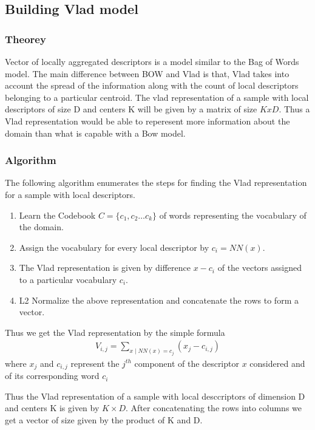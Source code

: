 \documentclass[final,leqno,onefignum,onetabnum]{siamltexmm}
\begin{document}
\subsection{Building Vlad model}

\subsubsection{Theorey}
Vector of locally aggregated descriptors is a model similar to the Bag of Words model.  
The main difference between BOW and Vlad is that, Vlad takes into account the spread of the information along with the count of local descriptors belonging to a particular centroid.
The vlad representation of a sample with local descriptors of size D and centers K will be given by a matrix of size $K x D $.  Thus a Vlad representation would be able to reperesent more information about the domain than what is capable with a Bow model.

\subsubsection{Algorithm}
The following algorithm enumerates the steps for finding the Vlad representation for a sample with local descriptors.
\begin{enumerate}
  \item Learn the Codebook $ C = \{c_{1}, c_{2} \ldots c_{k}\} $ of words representing the vocabulary of the domain.
  \item Assign the vocabulary for every local descriptor by $ c_{i} = NN(x) $.
  \item The Vlad representation is given by difference $ x - c_{i} $ of the vectors assigned to a particular vocabulary $ c_{i} $.
  \item L2 Normalize the above representation and concatenate the rows to form a vector.
\end{enumerate}

Thus we get the Vlad representation by the simple formula
\begin{align*}
  V_{i,j} = \sum_{x \mid NN(x) = c_{j}} (x_{j} - c_{i, j})
\end{align*}
where $x_{j}$ and $c_{i,j}$ represent the $j^{th}$ component of the descriptor $x$ considered and of its corresponding word $c_{i}$

Thus the Vlad representation of a sample with local desccriptors of dimension D and centers K is given by $ K \times D $.
After concatenating the rows into columns we get a vector of size given by the product of K and D.
\end{document}

